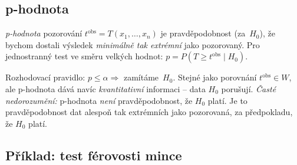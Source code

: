 \documentclass[11pt,a4paper]{article}
\begin{document}
\subsection{p-hodnota}

\begin{definice}[p-hodnota]
\emph{p-hodnota} pozorování $t^{\mathrm{obs}}=T(x_1,\dots,x_n)$ je pravděpodobnost (za~$H_0$), že bychom dostali výsledek \emph{minimálně tak extrémní} jako pozorovaný. Pro jednostranný test ve směru velkých hodnot: $p=P(T\ge t^{\mathrm{obs}}\mid H_0)$.
\end{definice}

\begin{intuice}
Rozhodovací pravidlo: $p\le\alpha\Rightarrow$ zamítáme~$H_0$. Stejné jako porovnání $t^{\mathrm{obs}}\in W$, ale p-hodnota dává navíc \emph{kvantitativní} informaci --  data $H_0$ porušují. \emph{Časté nedorozumění:} p-hodnota \emph{není} pravděpodobnost, že $H_0$ platí. Je to pravděpodobnost dat alespoň tak extrémních jako pozorovaná, za předpokladu, že $H_0$ platí.
\end{intuice}

\subsection{Příklad: test férovosti mince}
\end{document}
